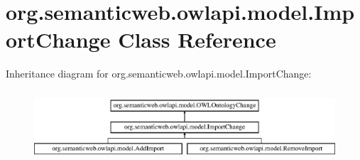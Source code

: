 \hypertarget{classorg_1_1semanticweb_1_1owlapi_1_1model_1_1_import_change}{\section{org.\-semanticweb.\-owlapi.\-model.\-Import\-Change Class Reference}
\label{classorg_1_1semanticweb_1_1owlapi_1_1model_1_1_import_change}
}
Inheritance diagram for org.\-semanticweb.\-owlapi.\-model.\-Import\-Change\-:\begin{figure}[H]
\begin{center}
\leavevmode
\includegraphics[height=2.633229cm]{classorg_1_1semanticweb_1_1owlapi_1_1model_1_1_import_change}
\end{center}
\end{figure}
